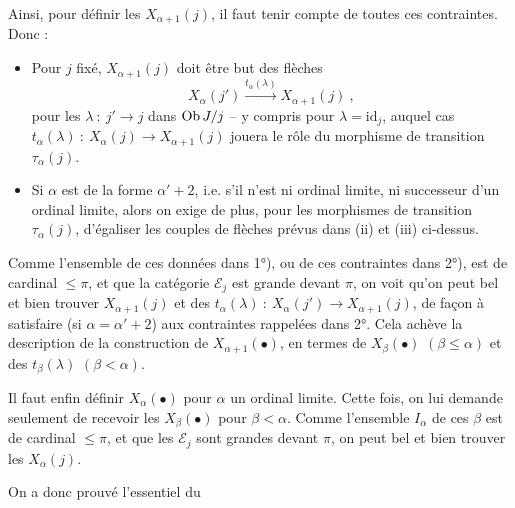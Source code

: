 Ainsi, pour définir les $X_{\alpha+1}(j)$, il faut tenir compte de toutes ces contraintes. Donc :
\begin{itemize}[leftmargin=3em]
\item[1°)] Pour $j$ fixé, $X_{\alpha+1}(j)$ doit être but des flèches
\[
X_\alpha(j') \xrightarrow{t_\alpha(\lambda)} X_{\alpha+1}(j)\ ,
\]
pour les $\lambda\ :\ j'\longrightarrow j$ dans $\operatorname{Ob} J/j$ -- y compris pour $\lambda=\mathrm{id}_j$, auquel cas $t_\alpha(\lambda)\ :\ X_\alpha(j)\longrightarrow X_{\alpha+1}(j)$ jouera le rôle du morphisme de transition $\tau_\alpha(j)$.
\item[2°)] Si $\alpha$ est de la forme $\alpha'+2$, i.e. s'il n'est ni ordinal limite, ni successeur d'un ordinal limite, alors on exige de plus, pour les morphismes de transition $\tau_\alpha(j)$, d'égaliser les couples de flèches prévus dans (ii) et (iii) ci-dessus.
\end{itemize}
Comme l'ensemble de ces données dans 1°), ou de ces contraintes dans 2°),
est de cardinal $\leqslant\pi$, et que la catégorie $\mathcal{E}_j$ est grande devant $\pi$, on voit qu'on peut bel et bien trouver $X_{\alpha+1}(j)$ et des $t_\alpha(\lambda)\ :\ X_\alpha(j')\longrightarrow X_{\alpha+1}(j)$, de façon à satisfaire (si $\alpha=\alpha'{+}2$) aux contraintes rappelées dans 2°. Cela achève la description de la construction de $X_{\alpha+1}(\bullet)$, en termes de $X_\beta(\bullet)$ $(\beta\leqslant\alpha)$ et des $t_\beta(\lambda)$ $(\beta<\alpha)$.

Il faut enfin définir $X_\alpha(\bullet)$ pour $\alpha$ un ordinal limite. Cette fois, on lui demande seulement de recevoir les $X_\beta(\bullet)$ pour $\beta<\alpha$. Comme l'ensemble $I_\alpha$ de ces $\beta$ est de cardinal $\leqslant\pi$, et que les $\mathcal{E}_j$ sont grandes devant $\pi$, on peut bel et bien trouver les $X_\alpha(j)$.

On a donc prouvé l'essentiel du

